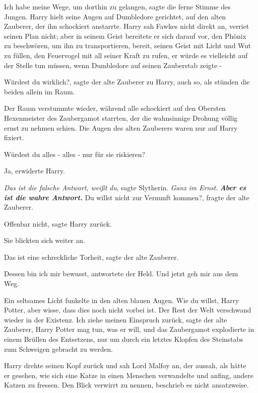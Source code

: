 \glqq{}Ich habe meine Wege, um dorthin zu gelangen\grqq{}, sagte die ferne Stimme
des Jungen. Harry hielt seine Augen auf Dumbledore gerichtet, auf den alten
Zauberer, der ihn schockiert anstarrte. Harry sah Fawkes nicht direkt an,
verriet seinen Plan nicht; aber in seinem Geist bereitete er sich darauf vor,
den Phönix zu beschwören, um ihn zu transportieren, bereit, seinen Geist mit
Licht und Wut zu füllen, den Feuervogel mit all seiner Kraft zu rufen, er würde
es vielleicht auf der Stelle tun müssen, wenn Dumbledore auf seinen Zauberstab
zeigte -

\glqq{}Würdest du wirklich?\grqq{}, sagte der alte Zauberer zu Harry, auch so,
als stünden die beiden allein im Raum.

Der Raum verstummte wieder, während alle schockiert auf den Obersten
Hexenmeister des Zaubergamot starrten, der die wahnsinnige Drohung völlig ernst
zu nehmen schien. Die Augen des alten Zauberers waren nur auf Harry fixiert.

\glqq{}Würdest du alles - alles - nur für sie riskieren?\grqq{}

\glqq{}Ja\grqq{}, erwiderte Harry.

\emph{Das ist die falsche Antwort, weißt du}, sagte Slytherin. \emph{Ganz im
Ernst}.
\textbf{}
\textbf{\emph{Aber es ist die wahre
Antwort.} }
\textbf{}
\glqq{}Du willst nicht zur Vernunft kommen?\grqq{}, fragte der alte Zauberer.

\glqq{}Offenbar nicht\grqq{}, sagte Harry zurück.

Sie blickten sich weiter an.

\glqq{}Das ist eine schreckliche Torheit\grqq{}, sagte der alte Zauberer.

\glqq{}Dessen bin ich mir bewusst\grqq{}, antwortete der Held. \glqq{}Und jetzt
geh mir aus dem Weg.\grqq{}

Ein seltsames Licht funkelte in den alten blauen Augen. \glqq{}Wie du willst,
Harry Potter, aber wisse, dass dies noch nicht vorbei ist.\grqq{} Der Rest der
Welt verschwand wieder in der Existenz. \glqq{}Ich ziehe meinen Einspruch
zurück\grqq{}, sagte der alte Zauberer, \glqq{}Harry Potter mag tun, was er
will\grqq{}, und das Zaubergamot explodierte in einem Brüllen des Entsetzens,
nur um durch ein letztes Klopfen des Steinstabs zum Schweigen gebracht zu
werden.

Harry drehte seinen Kopf zurück und sah Lord Malfoy an, der aussah, als hätte er
gesehen, wie sich eine Katze in einen Menschen verwandelte und anfing, andere
Katzen zu fressen. Den Blick verwirrt zu nennen, beschrieb es nicht ansatzweise.


